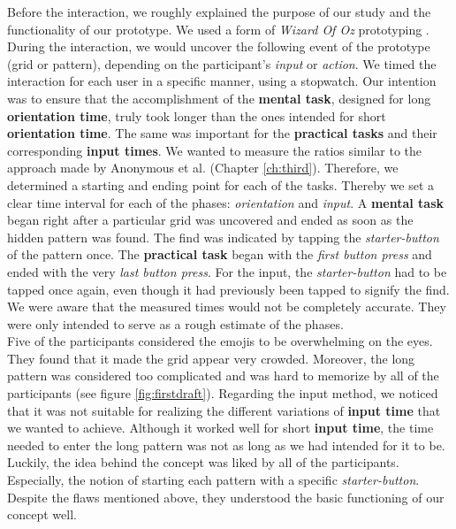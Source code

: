 Before the interaction, we roughly explained the purpose of our study and the functionality of our prototype. We used a form of \textit{Wizard Of Oz} prototyping \cite{Butz2014}. During the interaction, we would uncover the following event of the prototype (grid or pattern), depending on the participant's \textit{input} or \textit{action}. We timed the interaction for each user in a specific manner, using a stopwatch. Our intention was to ensure that the accomplishment of the \textbf{mental task}, designed for long \textbf{orientation time}, truly took longer than the ones intended for short \textbf{orientation time}. The same was important for the \textbf{practical tasks} and their corresponding \textbf{input times}. We wanted to measure the ratios similar to the approach made by Anonymous et al. \cite{anonymous} (Chapter \ref{ch:third}). Therefore, we determined a starting and ending point for each of the tasks. Thereby we set a clear time interval for each of the phases: \textit{orientation} and \textit{input}. A \textbf{mental task} began right after a particular grid was uncovered and ended as soon as the hidden pattern was found. The find was indicated by tapping the \textit{starter-button} of the pattern once. The \textbf{practical task} began with the \textit{first button press} and ended with the very \textit{last button press}.  For the input, the \textit{starter-button} had to be tapped once again, even though it had previously been tapped to signify the find. We were aware that the measured times would not be completely accurate. They were only intended to serve as a rough estimate of the phases.\\


Five of the participants considered the emojis to be overwhelming on the eyes. They found that it made the grid appear very crowded. Moreover, the long pattern was considered too complicated and was hard to memorize by all of the participants (see figure \ref{fig:firstdraft}). Regarding the input method, we noticed that it was not suitable for realizing the different variations of \textbf{input time} that we wanted to achieve. Although it worked well for short \textbf{input time}, the time needed to enter the long pattern was not as long as we had intended for it to be.
Luckily, the idea behind the concept was liked by all of the participants. Especially, the notion of starting each pattern with a specific \textit{starter-button}. Despite the flaws mentioned above, they understood the basic functioning of our concept well. \\

